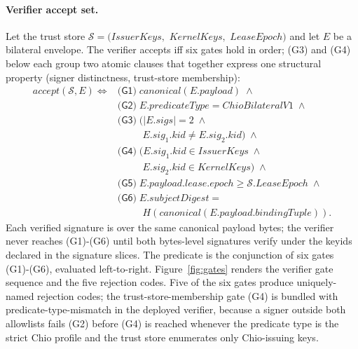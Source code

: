 \paragraph{Verifier accept set.} Let the trust store
$\mathcal{S} = (\mathit{IssuerKeys},$
$\mathit{KernelKeys},$
$\mathit{LeaseEpoch})$
and let $E$ be a bilateral envelope. The verifier accepts iff six gates hold in order; (G3) and (G4) below each group two atomic clauses that together express one structural property (signer distinctness, trust-store membership):
\begin{align*}
  \mathit{accept}(\mathcal{S},E) \iff{}
  & \textsf{(G1)}\;\mathit{canonical}(E.\mathit{payload}) \;\wedge \\
  & \textsf{(G2)}\;E.\mathit{predicateType} = \mathit{ChioBilateralV1} \;\wedge \\
  & \textsf{(G3)}\;\bigl(|E.\mathit{sigs}|=2 \;\wedge \\
  & \qquad\;\; E.\mathit{sig}_1.\mathit{kid} \ne E.\mathit{sig}_2.\mathit{kid}\bigr) \;\wedge \\
  & \textsf{(G4)}\;\bigl(E.\mathit{sig}_1.\mathit{kid} \in \mathit{IssuerKeys}\;\wedge \\
  & \qquad\;\; E.\mathit{sig}_2.\mathit{kid} \in \mathit{KernelKeys}\bigr) \;\wedge \\
  & \textsf{(G5)}\;E.\mathit{payload}.\mathit{lease}.\mathit{epoch} \ge \mathcal{S}.\mathit{LeaseEpoch} \;\wedge \\
  & \textsf{(G6)}\;E.\mathit{subjectDigest} = \\
  & \qquad\;\; H(\mathit{canonical}(E.\mathit{payload}.\mathit{bindingTuple})).
\end{align*}
Each verified signature is over the same canonical payload bytes; the verifier never reaches (G1)-(G6) until both bytes-level signatures verify under the keyids declared in the signature slices. The predicate is the conjunction of six gates (G1)-(G6), evaluated left-to-right. Figure~\ref{fig:gates} renders the verifier gate sequence and the five rejection codes. Five of the six gates produce uniquely-named rejection codes; the trust-store-membership gate (G4) is bundled with predicate-type-mismatch in the deployed verifier, because a signer outside both allowlists fails (G2) before (G4) is reached whenever the predicate type is the strict Chio profile and the trust store enumerates only Chio-issuing keys.

